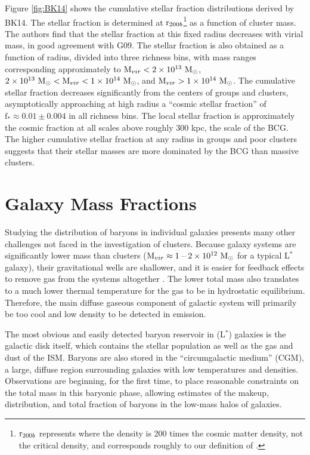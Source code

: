 Figure \ref{fig:BK14} shows the cumulative stellar fraction
distributions derived by BK14. The stellar fraction is determined at
$\textrm{r}{}_{200b}$\footnote{$\textrm{r}{}_{200b}$ represents where the
  density is 200 times the cosmic matter density, not the critical
  density, and corresponds roughly to our definition of \rvir{}.} as a
function of cluster mass. The authors find that the stellar fraction
at this fixed radius decreases with virial mass, in good agreement with
G09. The stellar fraction is also obtained as a function of radius,
divided into three richness bins, with mass ranges corresponding
approximately to $\textrm{M\ensuremath{_{vir}}}{}< 2\times 10^{13}~\textrm{M}_\odot$, $2\times 10^{13}~\textrm{M}_\odot{} <
\textrm{M\ensuremath{_{vir}}}{} < 1\times 10^{14}~\textrm{M}_\odot{}$, and $\textrm{M\ensuremath{_{vir}}}{}>1\times 10^{14}~\textrm{M}_\odot{}$. The
cumulative stellar fraction decreases significantly from the centers
of groups and clusters, asymptotically approaching at high radius a
``cosmic stellar fraction'' of $\textrm{f}_{*} \approx 0.01 \pm 0.004$
in all richness bins. The local stellar fraction is approximately the
cosmic fraction at all scales above roughly $300$ kpc, the scale of
the BCG. The higher cumulative stellar fraction at any radius in
groups and poor clusters suggests that their stellar masses are more
dominated by the BCG than massive clusters.



\section{Galaxy Mass Fractions}
\label{sec:Galaxy}

Studying the distribution of baryons in individual galaxies presents
many other challenges not faced in the investigation of
clusters. Because galaxy systems are significantly lower mass than
clusters ($\textrm{M\ensuremath{_{vir}}} \approx 1\;\textrm{--}\;2\times 10^{12}~\textrm{M}_\odot{}$ for a typical
L$^*$ galaxy), their gravitational wells are shallower, and it is
easier for feedback effects to remove gas from the systems altogether
. The lower total mass also translates to a
much lower thermal temperature for the gas to be in hydrostatic
equilibrium. Therefore, the main diffuse gaseous component of galactic system
will primarily be too cool and low density to be detected in
emission. 

The most obvious and easily detected baryon reservoir in (L$^*$)
galaxies is the galactic disk itself, which contains the stellar
population as well as the gas and dust of the ISM. Baryons are also
stored in the ``circumgalactic medium'' (CGM), a large, diffuse region
surrounding galaxies with low temperatures and densities. Observations
are beginning, for the first time, to place reasonable constraints on
the total mass in this baryonic phase, allowing estimates of the
makeup, distribution, and total fraction of baryons in the low-mass
halos of galaxies.


